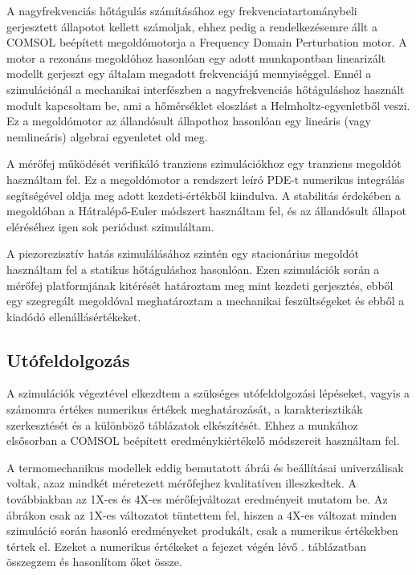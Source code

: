A nagyfrekvenciás hőtágulás számításához egy frekvenciatartománybeli gerjesztett állapotot kellett számoljak, ehhez pedig a rendelkezésemre állt a COMSOL beépített megoldómotorja a Frequency Domain Perturbation motor. A motor a rezonáns megoldóhoz hasonlóan egy adott munkapontban linearizált modellt gerjeszt egy általam megadott frekvenciájú mennyiséggel. Ennél a szimulációnál a mechanikai interfészben a nagyfrekvenciás hőtáguláshoz használt modult kapcsoltam be, ami a hőmérséklet eloszlást a Helmholtz-egyenletből veszi. Ez a megoldómotor az állandósult állapothoz hasonlóan egy lineáris (vagy nemlineáris) algebrai egyenletet old meg.

A mérőfej működését verifikáló tranziens szimulációkhoz egy tranziens megoldót használtam fel. Ez a megoldómotor a rendszert leíró PDE-t numerikus integrálás segítségével oldja meg adott kezdeti-értékből kiindulva. A stabilitás érdekében a megoldóban a Hátralépő-Euler módszert használtam fel, és az állandósult állapot eléréséhez igen sok periódust szimuláltam.

A piezorezisztív hatás szimulálásához szintén egy stacionárius megoldót használtam fel a statikus hőtáguláshoz hasonlóan. Ezen szimulációk során a mérőfej platformjának kitérését határoztam meg mint kezdeti gerjesztés, ebből egy szegregált megoldóval meghatároztam a mechanikai feszültségeket és ebből a kiadódó ellenállásértékeket.

\subsection{Utófeldolgozás}
\label{sec:thermo_post_process}

A szimulációk végeztével elkezdtem a szükséges utófeldolgozási lépéseket, vagyis a számomra értékes numerikus értékek meghatározását, a karakterisztikák szerkesztését és a különböző táblázatok elkészítését. Ehhez a munkához elsősorban a COMSOL beépített eredménykiértékelő módszereit használtam fel.

A termomechanikus modellek eddig bemutatott ábrái és beállításai univerzálisak voltak, azaz mindkét méretezett mérőfejhez kvalitatíven illeszkedtek. A továbbiakban az 1X-es és 4X-es mérőfejváltozat eredményeit mutatom be. Az ábrákon csak az 1X-es változatot tüntettem fel, hiszen a 4X-es változat minden szimuláció során hasonló eredményeket produkált, csak a numerikus értékekben tértek el. Ezeket a numerikus értékeket a fejezet végén lévő . táblázatban összegzem és hasonlítom őket össze.


